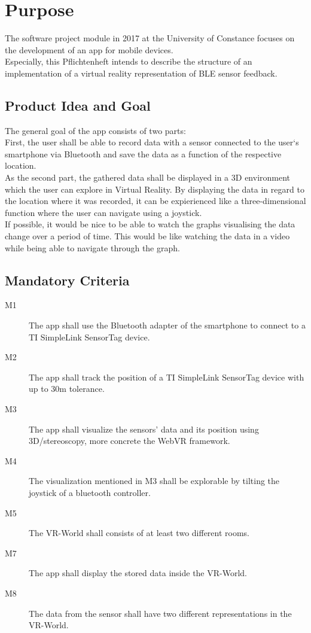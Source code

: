 \section{Purpose}
The software project module in 2017 at the University of Constance focuses on the development of an app for mobile devices. \\
Especially, this Pflichtenheft intends to describe the structure of an implementation of a virtual reality representation of BLE sensor feedback.

\subsection{Product Idea and Goal}
The general goal of the app consists of two parts: \\
First, the user shall be able to record data with a sensor connected to the user`s smartphone via Bluetooth and save the data as a function of the respective location. \\
As the second part, the gathered data shall be displayed in a 3D environment which the user can explore in Virtual Reality. By displaying the data in regard to the location where it was recorded, it can be expierienced like a three-dimensional function where the user can navigate using a joystick. \\
If possible, it would be nice to be able to watch the graphs visualising the data change over a period of time. This would be like watching the data in a video while being able to navigate through the graph.


\subsection{Mandatory Criteria}

\begin{description}
  \item[M1] The app shall use the Bluetooth adapter of the smartphone to connect to a TI SimpleLink SensorTag device.
  \item[M2] The app shall track the position of a TI SimpleLink SensorTag device with up to 30m tolerance.
  \item[M3] The app shall visualize the sensors' data and its position using 3D/stereoscopy, more concrete the WebVR framework.
  \item[M4] The visualization mentioned in M3 shall be explorable by tilting the joystick of a bluetooth controller.
  \item[M5] The VR-World shall consists of at least two different rooms.
  \item[M7] The app shall display the stored data inside the VR-World.
  \item[M8] The data from the sensor shall have two different representations in the VR-World.
\end{description}

